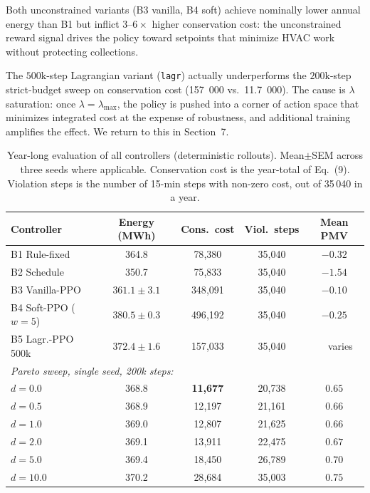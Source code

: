 \documentclass[11pt,a4paper]{article}
\begin{document}
Both unconstrained variants (B3 vanilla, B4 soft) achieve nominally
lower annual energy than B1 but inflict $3$--$6\times$ higher
conservation cost: the unconstrained reward signal drives the policy
toward setpoints that minimize HVAC work without protecting
collections.

The $500\mathrm{k}$-step Lagrangian variant (\texttt{lagr}) actually
underperforms the $200\mathrm{k}$-step strict-budget sweep on
conservation cost (\num{157}~000 vs.\ \num{11.7}~000). The cause is
$\lambda$ saturation: once $\lambda=\lambda_{\max}$, the policy is
pushed into a corner of action space that minimizes integrated cost at
the expense of robustness, and additional training amplifies the
effect. We return to this in Section~7.

\begin{table}[t]
\centering
\caption{Year-long evaluation of all controllers (deterministic
rollouts). Mean$\pm$SEM across three seeds where applicable.
Conservation cost is the year-total of Eq.~(9).
Violation steps is the number of 15-min steps with non-zero cost,
out of 35\,040 in a year.}
\label{tab:headline}
\small
\setlength{\tabcolsep}{4pt}
\begin{tabular}{lcccc}
\toprule
Controller & Energy (MWh) & Cons.\ cost & Viol.\ steps & Mean PMV \\
\midrule
B1 Rule-fixed       & 364.8                       & 78{,}380   & 35{,}040 & $-0.32$ \\
B2 Schedule         & 350.7                       & 75{,}833   & 35{,}040 & $-1.54$ \\
B3 Vanilla-PPO      & $361.1\pm 3.1$              & 348{,}091  & 35{,}040 & $-0.10$ \\
B4 Soft-PPO ($w=5$) & $380.5\pm 0.3$              & 496{,}192  & 35{,}040 & $-0.25$ \\
B5 Lagr.-PPO 500k   & $372.4\pm 1.6$              & 157{,}033  & 35{,}040 & $\phantom{-}$varies \\
\midrule
\multicolumn{5}{l}{\emph{Pareto sweep, single seed, 200k steps:}}\\
$d=0.0$  & 368.8 & \textbf{11{,}677} & 20{,}738 & $0.65$ \\
$d=0.5$  & 368.9 & 12{,}197          & 21{,}161 & $0.66$ \\
$d=1.0$  & 369.0 & 12{,}807          & 21{,}625 & $0.66$ \\
$d=2.0$  & 369.1 & 13{,}911          & 22{,}475 & $0.67$ \\
$d=5.0$  & 369.4 & 18{,}450          & 26{,}789 & $0.70$ \\
$d=10.0$ & 370.2 & 28{,}684          & 35{,}003 & $0.75$ \\
\bottomrule
\end{tabular}
\end{table}
\end{document}
